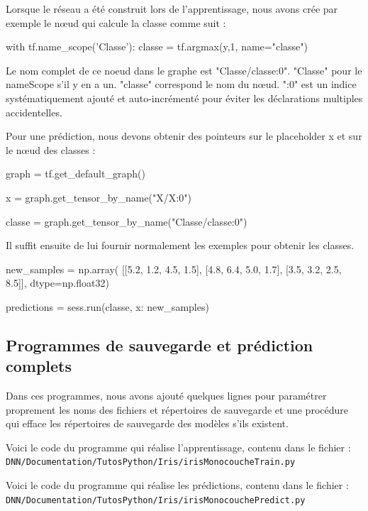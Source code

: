 \documentclass[a4paper,11pt]{book}
\begin{document}
Lorsque le réseau a été construit lors de l'apprentissage, nous avons crée par exemple le nœud qui calcule la classe comme suit :
\begin{mypython}
with tf.name_scope('Classe'):
    classe = tf.argmax(y,1, name="classe")
\end{mypython}

Le nom complet de ce noeud dans le graphe est "Classe/classe:0". "Classe" pour le nameScope s'il y en a un. "classe" correspond le nom du nœud. ":0" est un indice systématiquement ajouté et auto-incrémenté pour éviter les déclarations multiples accidentelles.

Pour une prédiction, nous devons obtenir des pointeurs sur le placeholder x et sur le nœud des classes :

\begin{mypython}
graph = tf.get_default_graph()

x = graph.get_tensor_by_name("X/X:0")
  
classe = graph.get_tensor_by_name("Classe/classe:0")
\end{mypython}
Il suffit ensuite de lui fournir normalement les exemples pour obtenir les classes.

\begin{mypython}

new_samples = np.array(
    [[5.2, 1.2, 4.5, 1.5],
    [4.8, 6.4, 5.0, 1.7],
    [3.5, 3.2, 2.5, 8.5]], dtype=np.float32)

predictions = sess.run(classe, {x: new_samples})
\end{mypython}

\subsection{Programmes de sauvegarde et prédiction complets}
Dans ces programmes, nous avons ajouté quelques lignes pour paramétrer proprement les noms des fichiers et répertoires de sauvegarde et une procédure qui efface les répertoires de sauvegarde des modèles s'ils existent.

Voici le code du programme qui réalise l'apprentissage, contenu dans le fichier :\\
\verb+DNN/Documentation/TutosPython/Iris/irisMonocoucheTrain.py+




Voici le code du programme qui réalise les prédictions, contenu dans le fichier :\\
\verb+DNN/Documentation/TutosPython/Iris/irisMonocouchePredict.py+
\end{document}
